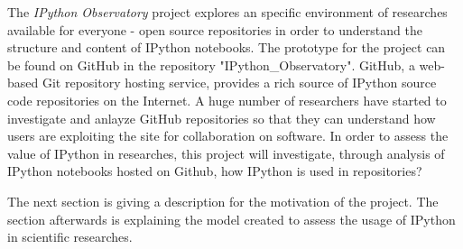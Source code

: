 The \textit{IPython Observatory}\cite{IPObs} project explores an specific environment of researches available for everyone - open source repositories in order to understand the structure and content of IPython notebooks. The prototype for the project can be found on GitHub in the repository "IPython\_Observatory"\cite{IPObs}. GitHub, a web-based Git repository hosting service, provides a rich source of IPython source code repositories on the Internet.\cite{gitHubWiki} A huge number of researchers have started to investigate and anlayze GitHub repositories so that they can understand how users are exploiting the site for collaboration on software. \cite{kalliamvakou2007promises} In order to assess the value of IPython in researches, this project will investigate, through analysis of IPython notebooks hosted on Github, how IPython is used in repositories?

The next section is giving a description for the motivation of the project. The section afterwards is explaining the model created to assess the usage of IPython in scientific researches.

